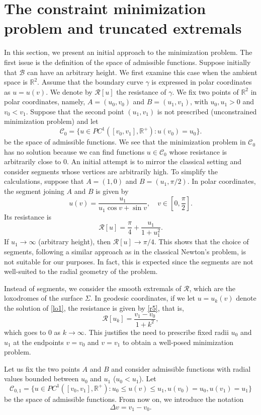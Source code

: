 \documentclass[a4paper,12pt]{amsart}
\theoremstyle{definition}
\def\r{\mathbb R}
\begin{document}
\section{The constraint minimization problem and truncated extremals}\label{s4}

In this section, we present an initial approach to the minimization problem. The first issue is the definition of the space of admissible functions. Suppose initially that $\mathcal{B}$ can have an arbitrary height. We first examine this case when   the ambient space is $\r^2$. Assume that the boundary curve $\gamma$ is expressed in polar coordinates as $u=u(v)$. We denote by $\mathcal{R}[u]$ the resistance of $\gamma$. We fix two points of $\r^2$ in polar coordinates, namely, $A=(u_0,v_0)$ and $B=(u_1,v_1)$, with $u_0,u_1>0$ and $v_0<v_1$. Suppose that the second point $(u_1,v_1)$ is not prescribed (unconstrained  minimization problem) and let 
$$\mathcal{C}_0=\{ u \in PC^1([v_0,v_1],\r^+)\colon u(v_0)=u_0\}.$$
be the space of admissible functions. We see that the minimization problem in $\mathcal{C}_0$ has no   solution because we can find functions $u\in\mathcal{C}_0$ whose resistance is arbitrarily close to $0$. An initial  attempt is to mirror the classical setting and consider segments whose vertices are arbitrarily high.   To simplify the calculations, suppose that $A=(1,0)$ and $B=(u_1,\pi/2)$. In polar coordinates,  the segment joining $A$ and $B$ is given by 
$$u(v)=\frac{u_1}{u_1\cos v+\sin v},\quad v\in [0,\frac{\pi}{2}].$$
Its resistance is 
$$\mathcal{R}[u]=\frac{\pi}{4}+\frac{u_1}{1+u_1^2}.$$
If $u_1\to\infty$ (arbitrary height), then $\mathcal{R}[u]\to \pi/4$. This shows that the choice of segments, following a similar approach as in the classical Newton's problem, is not suitable for our purposes. In fact, this is expected since the segments are not well-suited to the radial geometry of the problem. 

Instead of segments, we consider the smooth extremals of $\mathcal{R}$, which are the loxodromes of the surface $\Sigma$. In geodesic coordinates, if we let $u=u_k(v)$ denote the solution of \eqref{lo1},   the resistance is given by \eqref{r5}, that is,   
$$\mathcal{R}[u_k] = \frac{v_1-v_0}{1+k^2},$$
which goes to $0$ as $k \to \infty$. This justifies the need to prescribe fixed   radii $u_0$ and $u_1$ at the endpoints $v=v_0$ and $v=v_1$ to obtain a well-posed minimization problem.  

Let us fix the two points $A$ and $B$ and consider admissible functions with radial values bounded between $u_0$ and $u_1$ ($u_0 < u_1$). Let 
$$\mathcal{C}_{0,1} = \{ u \in PC^1([v_0,v_1],\r^+)\colon u_0 \leq u(v) \leq u_1, u(v_0)=u_0, u(v_1)=u_1\}$$
be the space of admissible functions. From now on, we introduce the notation 
$$\Delta v= v_1 - v_0.$$
\end{document}
